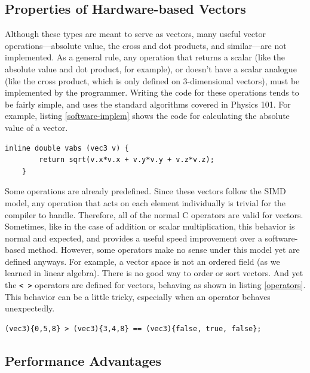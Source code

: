 \documentclass[12pt,twoside]{reedthesis}
\newcommand\code[1]{\colorbox{light-gray}{\texttt{\textcolor{black}{#1}}}}
\begin{document}
\subsection{Properties of Hardware-based Vectors}

Although these types are meant to serve as vectors, many useful vector operations---absolute value, the cross and dot products, and similar---are not implemented. As a general rule, any operation that returns a scalar (like the absolute value and dot product, for example), or doesn't have a scalar analogue (like the cross product, which is only defined on 3-dimensional vectors), must be implemented by the programmer. Writing the code for these operations tends to be fairly simple, and uses the standard algorithms covered in Physics 101. For example, listing \ref{software-implem} shows the code for calculating the absolute value of a vector.

\begin{lstlisting}[caption={Implementing the absolute value function in software\label{software-implem}}]
    inline double vabs (vec3 v) {
        return sqrt(v.x*v.x + v.y*v.y + v.z*v.z);
    }
\end{lstlisting}

Some operations are already predefined. Since these vectors follow the SIMD model, any operation that acts on each element individually is trivial for the compiler to handle. Therefore, all of the normal C operators are valid for vectors. Sometimes, like in the case of addition or scalar multiplication, this behavior is normal and expected, and provides a useful speed improvement over a software-based method. However, some operators make no sense under this model yet are defined anyways. For example, a vector space is not an ordered field (as we learned in linear algebra). There is no good way to order or sort vectors. And yet the \code{< >} operators are defined for vectors, behaving as shown in listing \ref{operators}. This behavior can be a little tricky, especially when an operator behaves unexpectedly.

\begin{lstlisting}[caption={Some operations aren't especially useful\label{operators}}]
    (vec3){0,5,8} > (vec3){3,4,8} == (vec3){false, true, false};
\end{lstlisting}



\subsection{Performance Advantages}
\end{document}
